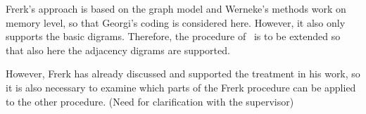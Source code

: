 \documentclass[a4paper]{scrartcl}
\begin{document}
Frerk's approach is based on the graph model and Werneke's methods work on memory level, so that Georgi's coding is considered here. However, it also only supports the basic digrams.
Therefore, the procedure of~\cite{werneke} is to be extended so that also here the adjacency digrams are supported.

However, Frerk has already discussed and supported the treatment in his work, so it is also necessary to examine which parts of the Frerk procedure can be applied to the other procedure. (Need for clarification with the supervisor)


\pagebreak
\printbibliography
\end{document}
